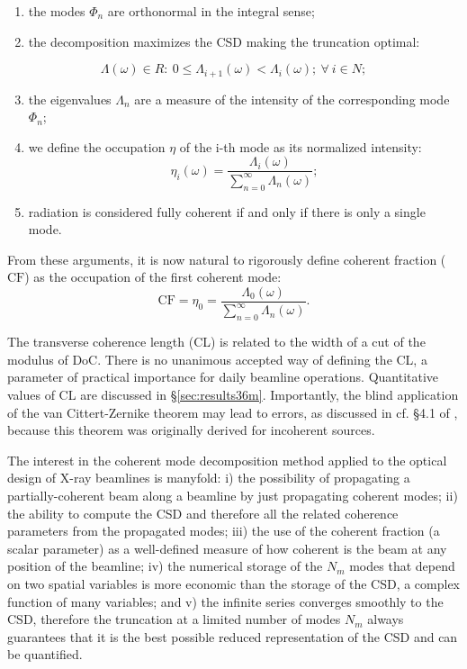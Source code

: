 \documentclass[preprint]{iucr}
\newcommand{\inred}[1]{{\color{red}#1}}
\begin{document}
\begin{enumerate}%
\item the modes $\Phi_n$ are orthonormal in the integral sense;
\item the decomposition maximize\inred{s} the CSD making the truncation optimal:
\end{enumerate}
\begin{equation*}
\Lambda(\omega) \in {R}
:~0\leq \Lambda_{i+1}(\omega)<\Lambda_i(\omega);~\forall~i \in {N};
\end{equation*}
\begin{enumerate}%
\setcounter{enumi}{2}
\item the eigenvalues $\Lambda_n$ are a measure of the intensity of the corresponding mode $\Phi_{n}$; 
\item we define the occupation $\eta$ of the i-th mode as its normalized intensity: 
\begin{equation}
\eta_i(\omega) =\frac{\Lambda_i(\omega)}{\sum\limits_{n=0}^\infty{\Lambda_n(\omega)}};
\end{equation}
\item radiation is considered fully coherent if and only if there is only a single mode.
\end{enumerate}

From these arguments, it is now natural to rigorously define coherent fraction ($\text{CF}$) as the occupation of the first coherent mode:
\begin{equation}
\text{CF}=\eta_0=\frac{\Lambda_0(\omega)}{\sum\limits_{n=0}^\infty{\Lambda_n(\omega)}}. \label{eq:CF2D}
\end{equation}

The transverse coherence length (CL) is related to the width of a cut of the modulus of DoC. There is no unanimous accepted way of defining the CL, a parameter of practical importance for daily beamline operations. Quantitative values of CL are discussed in \S{\ref{sec:results36m}}. Importantly, the blind application of the van Cittert-Zernike theorem may lead to errors, as discussed in cf. §4.1 of \cite{geloni2008}, because this theorem was originally derived for incoherent sources. 

The interest \inred{in} the coherent mode decomposition method \inred{applied to the} optical design of X-ray beamlines is manyfold: 
i) the possibility of propagating a partially-coherent beam along a beamline by just propagating coherent modes; 
ii) the ability to compute the CSD and therefore all the related coherence parameters from the propagated modes;
iii) the use of the coherent fraction (a scalar parameter) as a well-defined measure of how coherent is the beam at any position of the beamline;
iv) the numerical storage of the $N_m$ modes that depend on two spatial variables is more economic than the storage of the CSD, a complex function of many variables;
and v) the infinite series converges smoothly to the CSD, therefore the truncation at a limited number of modes $N_m$ always guarantees that it is the best possible reduced representation of the CSD and can be quantified.
\end{document}
